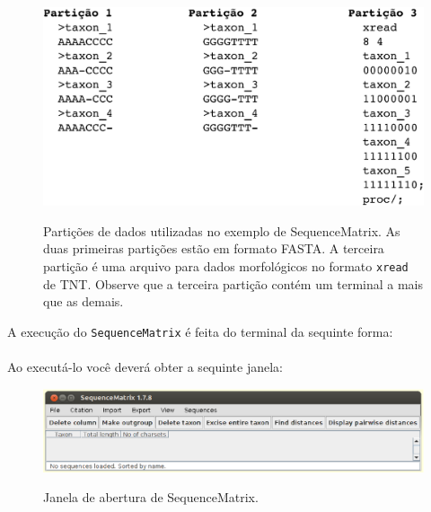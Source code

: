 \begin{refsection}
  \begin{figure}[H]
       \centering
      {\includegraphics[scale=1.0]{figures/tut7/partitions.eps}}
	{\caption[Três exemplos de partições de dados]{Partições de dados utilizadas no exemplo de SequenceMatrix. As duas primeiras partições estão em formato FASTA. A terceira partição é uma arquivo para dados morfológicos no formato \texttt{xread} de TNT. Observe que a terceira partição contém um terminal a mais que as demais.}\label{tut7:fig:partitions}}
  \end{figure}


A execução do \texttt{SequenceMatrix} é feita do terminal da sequinte forma:\\

\\

Ao executá-lo você deverá obter a sequinte janela:\\

  \begin{figure}[H]
       \centering
      {\includegraphics[scale=0.5]{figures/tut7/seqmatrix_1.eps}}
	{\caption[Janela de abertura de SequenceMatrix]{Janela de abertura de SequenceMatrix.}\label{tut7:fig:seqmatrix_1}}
  \end{figure}


\end{refsection}
